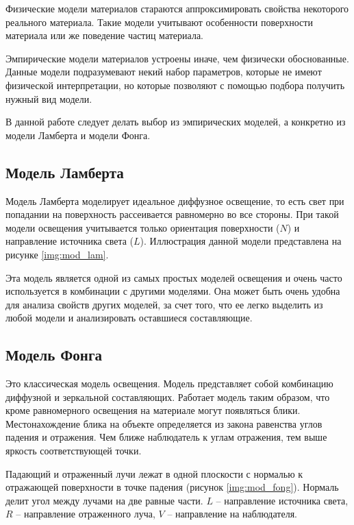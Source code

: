 Физические модели материалов стараются аппроксимировать свойства некоторого реального материала. Такие модели учитывают особенности поверхности материала или же поведение частиц материала.

Эмпирические модели материалов устроены иначе, чем физически обоснованные. Данные модели подразумевают некий набор параметров, которые не имеют физической интерпретации, но которые позволяют с помощью подбора получить нужный вид модели.

В данной работе следует делать выбор из эмпирических моделей, а конкретно из модели Ламберта и модели Фонга.

\subsection{Модель Ламберта}

Модель Ламберта моделирует идеальное диффузное освещение, то есть свет при попадании на поверхность рассеивается равномерно во все стороны. При такой модели освещения учитывается только ориентация поверхности ($N$) и направление источника света ($L$). Иллюстрация данной модели представлена на рисунке \ref{img:mod_lam}.


Эта модель является одной из самых простых моделей освещения и очень часто используется в комбинации с другими моделями. Она может быть очень удобна для анализа свойств других моделей, за счет того, что ее легко выделить из любой модели и анализировать оставшиеся составляющие.

\subsection{Модель Фонга}

Это классическая модель освещения. Модель представляет собой комбинацию диффузной и зеркальной составляющих. Работает модель таким образом, что кроме равномерного освещения на материале могут появляться блики. Местонахождение блика на объекте определяется из закона равенства углов падения и отражения. Чем ближе наблюдатель к углам отражения, тем выше яркость соответствующей точки.


Падающий и отраженный лучи лежат в одной плоскости с нормалью к отражающей поверхности в точке падения (рисунок \ref{img:mod_fong}). Нормаль делит угол между лучами на две равные части. $L$ – направление источника света, $R$ – направление отраженного луча, $V$ – направление на наблюдателя.



